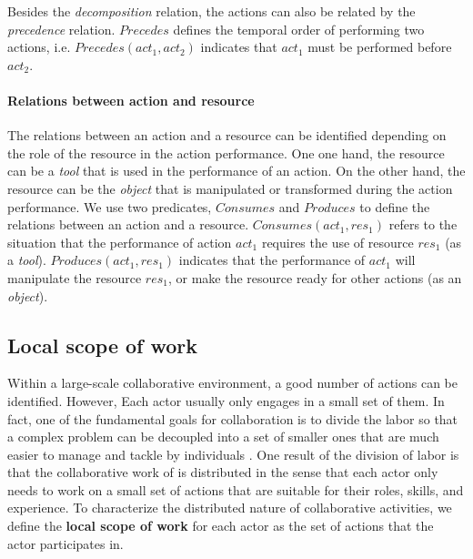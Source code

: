 Besides the \emph{decomposition} relation, the actions can also be related by the \emph{precedence} relation. $Precedes$ defines the temporal order of performing two actions, i.e. $Precedes(act_1, act_2)$ indicates that $act_1$ must be performed before $act_2$. 

\paragraph*{Relations between action and resource} %
\label{par:relations_between_action_and_resource}
The relations between an action and a resource can be identified depending on the role of the resource in the action performance. One one hand, the resource can be a \emph{tool} that is used in the performance of an action. On the other hand, the resource can be the \emph{object} that is manipulated or transformed during the action performance. We use two predicates, $Consumes$ and $Produces$ to define the relations between an action and a resource. $Consumes(act_1, res_1)$ refers to the situation that the performance of action $act_1$ requires the use of resource $res_1$  (as a \emph{tool}). $Produces(act_1, res_1)$ indicates that the performance of $act_1$ will manipulate the resource $res_1$, or make the resource ready for other actions (as an \emph{object}).

\subsection{Local scope of work} %
\label{sub:local_scope_of_work}
Within a large-scale collaborative environment, a good number of actions can be identified. However, Each actor usually only engages in a small set of them. In fact, one of the fundamental goals for collaboration is to divide the labor so that a complex problem can be decoupled into a set of smaller ones that are much easier to manage and tackle by individuals \cite{schmidt1992taking}. One result of the division of labor is that the collaborative work of is distributed in the sense that each actor only needs to work on a small set of actions that are suitable for their roles, skills, and experience. To characterize the distributed nature of collaborative activities, we define the \textbf{local scope of work} for each actor as the set of actions that the actor participates in.


